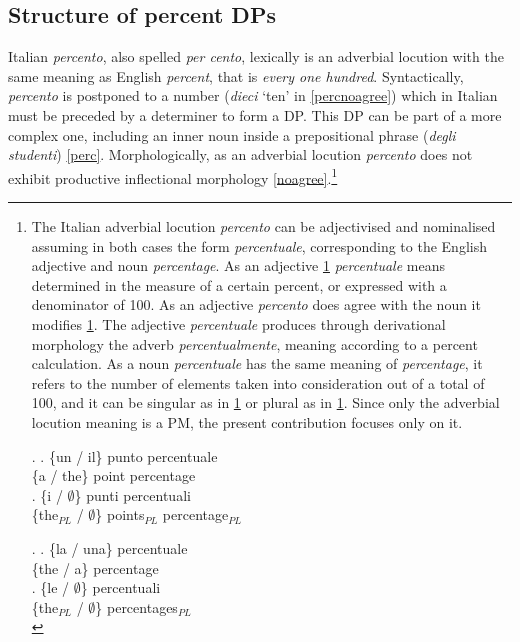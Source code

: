 \documentclass[charis, linguex]{glossa}
\begin{document}
 
\subsection{Structure of percent DPs} \label{SubSec-percentDP}

Italian \textit{percento}, also spelled \textit{per cento}, lexically is an adverbial locution with the same meaning as English \textit{percent}, that is \textit{every one hundred}. Syntactically, \textit{percento} is postponed to a number (\textit{dieci} `ten' in \ref{percnoagree}) which in Italian must be preceded by a determiner to form a DP. This DP can be part of a more complex one, including an inner noun inside a prepositional phrase (\textit{degli studenti}) \ref{perc}. Morphologically, as an adverbial locution \textit{percento} does not exhibit productive inflectional morphology \ref{noagree}.\footnote{The Italian adverbial locution \textit{percento} can be adjectivised and nominalised assuming in both cases the form \textit{percentuale}, corresponding to the English adjective and noun \textit{percentage}.  As an adjective \ref{adjective} \textit{percentuale} means determined in the measure of a certain percent, or expressed with a denominator of 100. As an adjective \textit{percento} does agree with the noun it modifies \ref{agree}. The adjective \textit{percentuale} produces through derivational morphology the adverb \textit{percentualmente}, meaning according to a percent calculation. As a noun \textit{percentuale} has the same meaning of \textit{percentage}, it refers to the number of elements taken into consideration out of a total of 100, and it can be singular as in \ref{nounsing} or plural as in \ref{nounplur}. Since only the adverbial locution meaning is a PM, the present contribution focuses only on it.

\ex. \ag.  \{un / il\} punto percentuale \\ 
              \{a / the\} point percentage \\   \label{adjective}
       \bg.  \{i                      /  $\emptyset$\}  punti percentuali \\
             \{the$_{PL}$ / $\emptyset$\} points$_{PL}$ percentage$_{PL}$  \\ \label{agree}

		  
\ex. \ag. \{la / una\}  percentuale \\
              \{the  / a\}  percentage \\  \label{nounsing}
     \bg. \{le / $\emptyset$\} percentuali \\
             \{the$_{PL}$ / $\emptyset$\}  percentages$_{PL}$ \\  \label{nounplur}}
  
\end{document}
